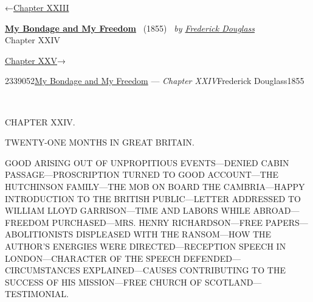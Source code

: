 \hypertarget{headerContainer}{}
\hypertarget{navigationHeader}{}
\protect\hypertarget{headerprevious}{}{←\href{/wiki/My_Bondage_and_My_Freedom_(1855)/Chapter_XXIII}{Chapter
XXIII}}

\textbf{\protect\hypertarget{header_title_text}{}{\href{/wiki/My_Bondage_and_My_Freedom_(1855)}{My
Bondage and My Freedom}}} ~(1855)~ \emph{by
\href{/wiki/Author:Frederick_Douglass}{\protect\hypertarget{header_author_text}{}{{Frederick
Douglass}}}}\\
\protect\hypertarget{header_section_text}{}{Chapter XXIV}

\protect\hypertarget{headernext}{}{\href{/wiki/My_Bondage_and_My_Freedom_(1855)/Chapter_XXV}{Chapter
XXV}→}

\hypertarget{navigationNotes}{}

\hypertarget{ws-data}{}
\protect\hypertarget{ws-article-id}{}{2339052}\protect\hypertarget{ws-title}{}{\href{/wiki/My_Bondage_and_My_Freedom_(1855)}{My
Bondage and My Freedom} --- \emph{Chapter
XXIV}}\protect\hypertarget{ws-author}{}{Frederick
Douglass}\protect\hypertarget{ws-year}{}{1855}

{\protect\hypertarget{365}{}{}}

~

{CHAPTER XXIV.}

TWENTY-ONE MONTHS IN GREAT BRITAIN.

{GOOD ARISING OUT OF UNPROPITIOUS EVENTS---DENIED CABIN
PASSAGE---PROSCRIPTION TURNED TO GOOD ACCOUNT---THE HUTCHINSON
FAMILY---THE MOB ON BOARD THE CAMBRIA---HAPPY INTRODUCTION TO THE
BRITISH PUBLIC---LETTER ADDRESSED TO WILLIAM LLOYD GARRISON---TIME AND
LABORS WHILE ABROAD---FREEDOM PURCHASED---MRS. HENRY RICHARDSON---FREE
PAPERS---ABOLITIONISTS DISPLEASED WITH THE RANSOM---HOW THE AUTHOR'S
ENERGIES WERE DIRECTED---RECEPTION SPEECH IN LONDON---CHARACTER OF THE
SPEECH DEFENDED---CIRCUMSTANCES EXPLAINED---CAUSES CONTRIBUTING TO THE
SUCCESS OF HIS MISSION---FREE CHURCH OF SCOTLAND---TESTIMONIAL.}

